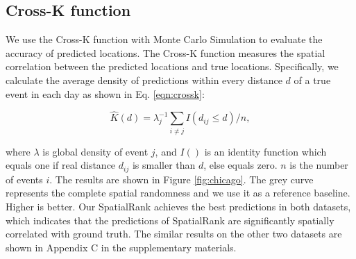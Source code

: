\documentclass{article}
\begin{document}
{\subsection{Cross-K function}

We use the Cross-K function\cite{doi:https://doi.org/10.1002/9781118445112.stat07751} with Monte Carlo Simulation\cite{TaoRan2019FCKa} to evaluate the accuracy of predicted locations. The Cross-K function measures the spatial correlation between the predicted locations and true locations. Specifically, we calculate the average density of predictions within every distance $d$ of a true event in each day as shown in Eq. \ref{eqn:crossk}:

\vspace{-0.1in}
\begin{equation} \label{eqn:crossk}
\hat{K}(d) =  \lambda_j^{-1}\sum_{i \neq j}I(d_{ij} \leq d)/n,
\end{equation}

\vspace{-0.1in}
\noindent where $\lambda$ is global density of event $j$, and $I()$ is an identity function which equals one if real distance $d_{ij}$ is smaller than $d$, else equals zero. $n$ is the number of events $i$. The results are shown in Figure \ref{fig:chicago}. The grey curve represents the complete spatial randomness and we use it as a reference baseline. Higher is better. Our SpatialRank achieves the best predictions in both datasets, which indicates that the predictions of SpatialRank are significantly spatially correlated with ground truth. The similar results on the other two datasets are shown in Appendix C in the supplementary materials. %

}
\end{document}
